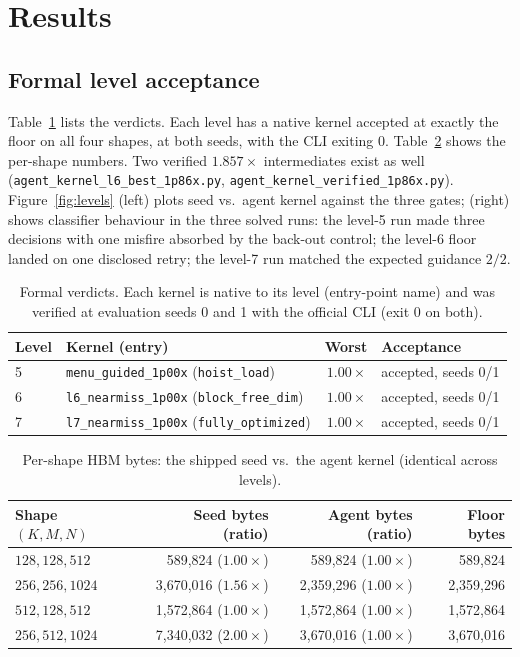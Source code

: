 \documentclass[10pt]{article}
\begin{document}
\section{Results}
\subsection{Formal level acceptance}
Table~\ref{tab:levels} lists the verdicts. Each level has a native kernel accepted at exactly the
floor on all four shapes, at both seeds, with the CLI exiting 0. Table~\ref{tab:shapes} shows the
per-shape numbers. Two verified $1.857\times$ intermediates exist as well
(\texttt{agent\_kernel\_l6\_best\_1p86x.py}, \texttt{agent\_kernel\_verified\_1p86x.py}).
Figure~\ref{fig:levels} (left) plots seed vs.\ agent kernel against the three gates; (right) shows
classifier behaviour in the three solved runs: the level-5 run made three decisions with one
misfire absorbed by the back-out control; the level-6 floor landed on one disclosed retry; the
level-7 run matched the expected guidance $2/2$.

\begin{table}[H]
\centering
\caption{Formal verdicts. Each kernel is native to its level (entry-point name) and was verified
at evaluation seeds 0 and 1 with the official CLI (exit 0 on both).}
\label{tab:levels}
\small
\begin{tabular}{llrl}
\toprule
Level & Kernel (entry) & Worst & Acceptance \\
\midrule
5 & \texttt{menu\_guided\_1p00x} (\texttt{hoist\_load}) & $1.00\times$ & accepted, seeds 0/1 \\
6 & \texttt{l6\_nearmiss\_1p00x} (\texttt{block\_free\_dim}) & $1.00\times$ & accepted, seeds 0/1 \\
7 & \texttt{l7\_nearmiss\_1p00x} (\texttt{fully\_optimized}) & $1.00\times$ & accepted, seeds 0/1 \\
\bottomrule
\end{tabular}
\end{table}

\begin{table}[H]
\centering
\caption{Per-shape HBM bytes: the shipped seed vs.\ the agent kernel (identical across levels).}
\label{tab:shapes}
\small
\begin{tabular}{lrrr}
\toprule
Shape $(K,M,N)$ & Seed bytes (ratio) & Agent bytes (ratio) & Floor bytes \\
\midrule
$128,128,512$  & 589{,}824 ($1.00\times$) & 589{,}824 ($1.00\times$) & 589{,}824 \\
$256,256,1024$ & 3{,}670{,}016 ($1.56\times$) & 2{,}359{,}296 ($1.00\times$) & 2{,}359{,}296 \\
$512,128,512$  & 1{,}572{,}864 ($1.00\times$) & 1{,}572{,}864 ($1.00\times$) & 1{,}572{,}864 \\
$256,512,1024$ & 7{,}340{,}032 ($2.00\times$) & 3{,}670{,}016 ($1.00\times$) & 3{,}670{,}016 \\
\bottomrule
\end{tabular}
\end{table}
\end{document}
